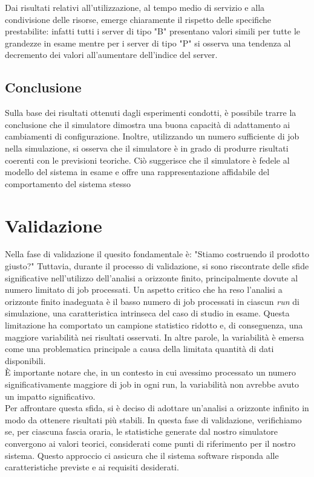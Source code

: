 \documentclass[a4paper, 12pt]{article}
\begin{document}
Dai risultati relativi all'utilizzazione, al tempo medio di servizio e alla condivisione delle risorse, emerge chiaramente il rispetto delle specifiche prestabilite: infatti tutti i server di tipo "B" presentano valori simili per tutte le grandezze in esame mentre per i server di tipo "P" si osserva una tendenza al decremento dei valori all'aumentare dell'indice del server.

\subsection{Conclusione}

Sulla base dei risultati ottenuti dagli esperimenti condotti, è possibile trarre la conclusione che il simulatore dimostra una buona capacità di adattamento ai cambiamenti di configurazione. Inoltre, utilizzando un numero sufficiente di job nella simulazione, si osserva che il simulatore è in grado di produrre risultati coerenti con le previsioni teoriche. Ciò suggerisce che il simulatore è fedele al modello del sistema in esame e offre una rappresentazione affidabile del comportamento del sistema stesso


\section{Validazione}
Nella fase di validazione il quesito fondamentale è: "Stiamo costruendo il prodotto giusto?" Tuttavia, durante il processo di validazione, si sono riscontrate delle sfide significative nell'utilizzo dell'analisi a orizzonte finito, principalmente dovute al numero limitato di job processati. Un aspetto critico che ha reso l'analisi a orizzonte finito inadeguata è il basso numero di job processati in ciascun \textit{run} di simulazione, una caratteristica intrinseca del caso di studio in esame. Questa limitazione ha comportato un campione statistico ridotto e, di conseguenza, una maggiore variabilità nei risultati osservati. In altre parole, la variabilità è emersa come una problematica principale a causa della limitata quantità di dati disponibili. \\

È importante notare che, in un contesto in cui avessimo processato un numero significativamente maggiore di job in ogni run, la variabilità non avrebbe avuto un impatto significativo. \\

Per affrontare questa sfida, si è deciso di adottare un'analisi a orizzonte infinito in modo da ottenere risultati più stabili. In questa fase di validazione, verifichiamo se, per ciascuna fascia oraria, le statistiche generate dal nostro simulatore convergono ai valori teorici, considerati come punti di riferimento per il nostro sistema. Questo approccio ci assicura che il sistema software risponda alle caratteristiche previste e ai requisiti desiderati. 
\end{document}
